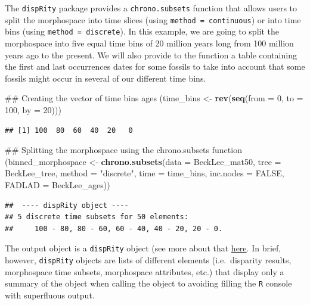 \documentclass[]{book}
\newenvironment{Shaded}{\begin{snugshade}}{\end{snugshade}}
\newcommand{\KeywordTok}[1]{\textcolor[rgb]{0.13,0.29,0.53}{\textbf{#1}}}
\newcommand{\DataTypeTok}[1]{\textcolor[rgb]{0.13,0.29,0.53}{#1}}
\newcommand{\DecValTok}[1]{\textcolor[rgb]{0.00,0.00,0.81}{#1}}
\newcommand{\StringTok}[1]{\textcolor[rgb]{0.31,0.60,0.02}{#1}}
\newcommand{\OtherTok}[1]{\textcolor[rgb]{0.56,0.35,0.01}{#1}}
\newcommand{\NormalTok}[1]{#1}
\theoremstyle{definition}
\theoremstyle{definition}
\theoremstyle{remark}
\begin{document}
The \texttt{dispRity} package provides a \texttt{chrono.subsets}
function that allows users to split the morphospace into time slices
(using \texttt{method\ =\ continuous}) or into time bins (using
\texttt{method\ =\ discrete}). In this example, we are going to split
the morphospace into five equal time bins of 20 million years long from
100 million years ago to the present. We will also provide to the
function a table containing the first and last occurrences dates for
some fossils to take into account that some fossils might occur in
several of our different time bins.

\begin{Shaded}
\begin{Highlighting}[]
\NormalTok{## Creating the vector of time bins ages}
\NormalTok{(time_bins <-}\StringTok{ }\KeywordTok{rev}\NormalTok{(}\KeywordTok{seq}\NormalTok{(}\DataTypeTok{from =} \DecValTok{0}\NormalTok{, }\DataTypeTok{to =} \DecValTok{100}\NormalTok{, }\DataTypeTok{by =} \DecValTok{20}\NormalTok{)))}
\end{Highlighting}
\end{Shaded}

\begin{verbatim}
## [1] 100  80  60  40  20   0
\end{verbatim}

\begin{Shaded}
\begin{Highlighting}[]
\NormalTok{## Splitting the morphospace using the chrono.subsets function}
\NormalTok{(binned_morphospace <-}\StringTok{ }\KeywordTok{chrono.subsets}\NormalTok{(}\DataTypeTok{data =}\NormalTok{ BeckLee_mat50, }\DataTypeTok{tree =}\NormalTok{ BeckLee_tree,}
    \DataTypeTok{method =} \StringTok{"discrete"}\NormalTok{, }\DataTypeTok{time =}\NormalTok{ time_bins, }\DataTypeTok{inc.nodes =} \OtherTok{FALSE}\NormalTok{,}
    \DataTypeTok{FADLAD =}\NormalTok{ BeckLee_ages))}
\end{Highlighting}
\end{Shaded}

\begin{verbatim}
##  ---- dispRity object ---- 
## 5 discrete time subsets for 50 elements:
##     100 - 80, 80 - 60, 60 - 40, 40 - 20, 20 - 0.
\end{verbatim}

The output object is a \texttt{dispRity} object (see more about that
\protect\hyperlink{The-guts-of-the-dispRity-package}{here}. In brief,
however, \texttt{dispRity} objects are lists of different elements
(i.e.~disparity results, morphospace time subsets, morphospace
attributes, etc.) that display only a summary of the object when calling
the object to avoiding filling the \texttt{R} console with superfluous
output.
\end{document}

